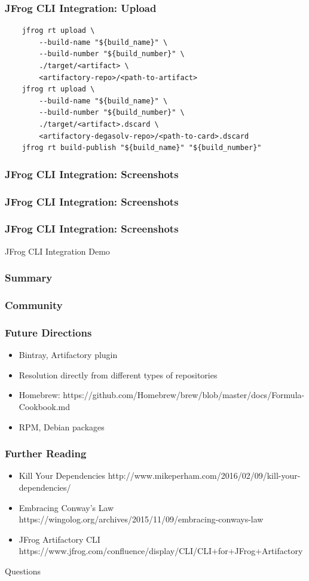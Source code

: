 \documentclass{beamer}
\begin{document}
\begin{frame}[fragile]
\frametitle{JFrog CLI Integration: Upload}
\begin{verbatim}
    jfrog rt upload \
        --build-name "${build_name}" \
        --build-number "${build_number}" \
        ./target/<artifact> \
        <artifactory-repo>/<path-to-artifact>
    jfrog rt upload \
        --build-name "${build_name}" \
        --build-number "${build_number}" \
        ./target/<artifact>.dscard \
        <artifactory-degasolv-repo>/<path-to-card>.dscard
    jfrog rt build-publish "${build_name}" "${build_number}"

\end{verbatim}
\end{frame}
\begin{frame}
\frametitle{JFrog CLI Integration: Screenshots}
\end{frame}
\begin{frame}
\frametitle{JFrog CLI Integration: Screenshots}
\end{frame}
\begin{frame}
\frametitle{JFrog CLI Integration: Screenshots}
\end{frame}
\begin{frame}
    \centerline{\color{blue}\Large JFrog CLI Integration Demo}
\end{frame}
\begin{frame}
  \frametitle{Summary}
\end{frame}
\begin{frame}
  \frametitle{Community}
\end{frame}
\begin{frame}
  \frametitle{Future Directions}
  \begin{itemize}
  \item Bintray, Artifactory plugin
  \item Resolution directly from different types of repositories
  \item Homebrew: https://github.com/Homebrew/brew/blob/master/docs/Formula-Cookbook.md
  \item RPM, Debian packages

  \end{itemize}
\end{frame}
\begin{frame}
  \frametitle{Further Reading}
  \begin{itemize}
  \item Kill Your Dependencies http://www.mikeperham.com/2016/02/09/kill-your-dependencies/
  \item Embracing Conway's Law https://wingolog.org/archives/2015/11/09/embracing-conways-law
  \item JFrog Artifactory CLI https://www.jfrog.com/confluence/display/CLI/CLI+for+JFrog+Artifactory
  \end{itemize}
\end{frame}
\begin{frame}
  \centerline{\color{blue}\Large Questions}
\end{frame}
\end{document}
